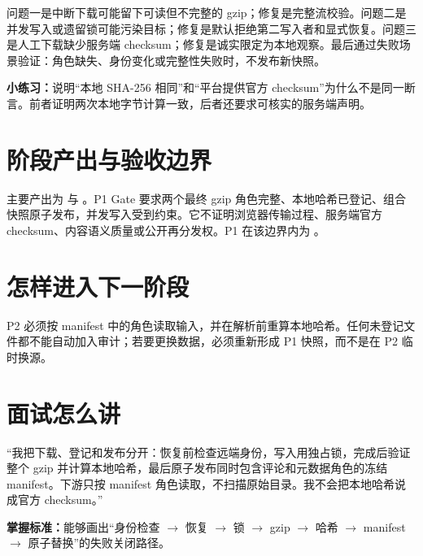 问题一是中断下载可能留下可读但不完整的 gzip；修复是完整流校验。问题二是并发写入或遗留锁可能污染目标；修复是默认拒绝第二写入者和显式恢复。问题三是人工下载缺少服务端 checksum；修复是诚实限定为本地观察。最后通过失败场景验证：角色缺失、身份变化或完整性失败时，不发布新快照。

\textbf{小练习：}说明“本地 SHA-256 相同”和“平台提供官方 checksum”为什么不是同一断言。前者证明两次本地字节计算一致，后者还要求可核实的服务端声明。

\section{阶段产出与验收边界}

主要产出为  与 。P1 Gate 要求两个最终 gzip 角色完整、本地哈希已登记、组合快照原子发布，并发写入受到约束。它不证明浏览器传输过程、服务端官方 checksum、内容语义质量或公开再分发权。P1 在该边界内为 \statuspassed。

\section{怎样进入下一阶段}

P2 必须按 manifest 中的角色读取输入，并在解析前重算本地哈希。任何未登记文件都不能自动加入审计；若要更换数据，必须重新形成 P1 快照，而不是在 P2 临时换源。

\section{面试怎么讲}

\begin{interviewbox}
“我把下载、登记和发布分开：恢复前检查远端身份，写入用独占锁，完成后验证整个 gzip 并计算本地哈希，最后原子发布同时包含评论和元数据角色的冻结 manifest。下游只按 manifest 角色读取，不扫描原始目录。我不会把本地哈希说成官方 checksum。”
\end{interviewbox}

\textbf{掌握标准：}能够画出“身份检查 $\rightarrow$ 恢复 $\rightarrow$ 锁 $\rightarrow$ gzip $\rightarrow$ 哈希 $\rightarrow$ manifest $\rightarrow$ 原子替换”的失败关闭路径。
